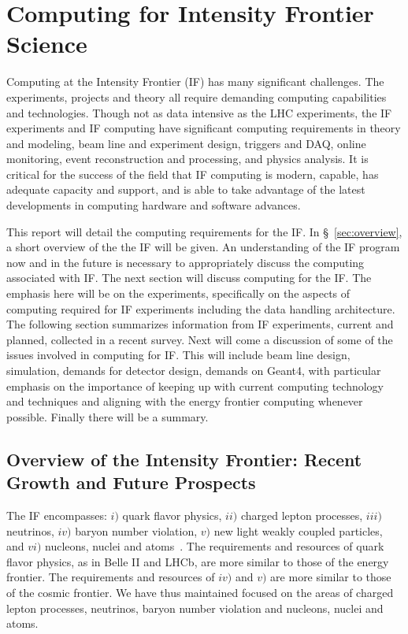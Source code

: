 \section{Computing for Intensity Frontier Science}

Computing at the Intensity Frontier (IF) has many significant challenges. The experiments, projects and theory all require demanding computing capabilities and technologies.  Though not as data intensive as the LHC experiments, the IF experiments and IF computing have significant computing requirements in theory and modeling, beam line and experiment design, triggers and DAQ, online monitoring, event reconstruction and processing, and physics analysis.  It is critical for the success of the field that IF computing is modern, capable, has adequate capacity and support, and is able to take advantage of the latest developments in computing hardware and software advances.

This report will detail the computing requirements for the IF.  In \S~\ref{sec:overview}, a short overview of the the IF will be given.  An understanding of the IF program now and in the future is necessary to appropriately discuss the computing associated with IF.  The next section will discuss computing for the IF.  The emphasis here will be on the experiments, specifically on the aspects of computing required for IF experiments including the data handling architecture.  The following section summarizes information from IF experiments, current and planned, collected in a recent survey.  Next will come a discussion of some of the issues involved in computing for IF. This will include beam line design, simulation, demands for detector design, demands on Geant4, with particular emphasis on the importance of keeping up with current computing technology and techniques and aligning with the energy frontier computing whenever possible.  Finally there will be a summary.


\subsection{Overview of the Intensity Frontier: Recent Growth and Future Prospects}

The IF encompasses: $i)$ quark flavor physics, $ii)$ charged lepton processes, $iii)$ neutrinos, $iv)$ baryon number violation, $v)$ new light weakly coupled particles, and $vi)$ nucleons, nuclei and atoms~\cite{snowmass-if-document}. The requirements and resources of quark flavor physics, as in Belle II and LHCb, are more similar to those of the energy frontier. The requirements and resources of $iv)$ and $v)$ are more similar to those of the cosmic frontier. We have thus maintained focused on the areas of charged lepton processes, neutrinos, baryon number violation and nucleons, nuclei and atoms. 

